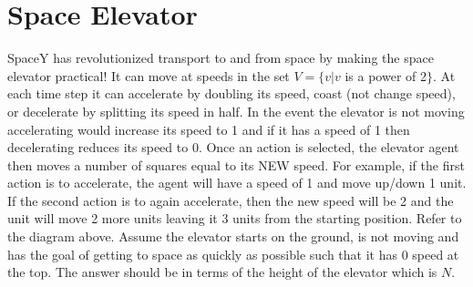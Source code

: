 \documentclass[12pt]{article}
\begin{document}
\newpage

\section{Space Elevator}


SpaceY has revolutionized transport to and from space by making the space elevator practical! It can move at speeds in the set $V = \{v | v$ is a power of 2$\}$. At each time step it can accelerate by doubling its speed, coast (not change speed), or decelerate by splitting its speed in half. In the event the elevator is not moving accelerating would increase its speed to 1 and if it has a speed of 1 then decelerating reduces its speed to 0.\newline
\newline
Once an action is selected, the elevator agent then moves a number of squares equal to its NEW speed. For example, if the first action is to accelerate, the agent will have a speed of 1 and move up/down 1 unit. If the second action is to again accelerate, then the new speed will be 2 and the unit will move 2 more units leaving it 3 units from the starting position.\newline
\newline
Refer to the diagram above. Assume the elevator starts on the ground, is not moving and has the goal of getting to space as quickly as possible such that it has 0 speed at the top. The answer should be in terms of the height of the elevator which is $N$.\newline
\end{document}
